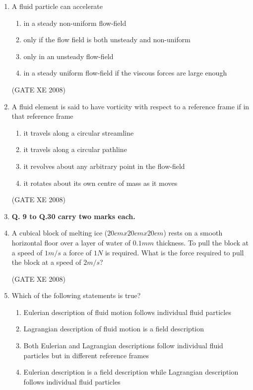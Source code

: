\documentclass[12pt]{article}
\begin{document}
\begin{enumerate}
(GATE XE 2008)
\item A fluid particle can accelerate

\begin{enumerate}
\item  in a steady non-uniform flow-field
\item  only if the flow field is both unsteady and non-uniform 
\item  only in an unsteady flow-field
\item  in a steady uniform flow-field if the viscous forces are large enough
\end{enumerate}

(GATE XE 2008)
\item A fluid element is said to have vorticity with respect to a reference frame if in that reference frame

\begin{enumerate}
\item  it travels along a circular streamline
\item  it travels along a circular pathline
\item  it revolves about any arbitrary point in the flow-field
\item  it rotates about its own centre of mass as it moves
\end{enumerate}

(GATE XE 2008)
\item[] \textbf{Q. 9 to Q.30 carry two marks each.}

\item A cubical block of melting ice ($20 cm x 20 cm x 20 cm$) rests on a smooth horizontal floor over a layer of water of $0.1 mm$ thickness. To pull the block at a speed of $1 m/s$ a force of $1 N$ is required. What is the force required to pull the block at a speed of $2 m/s$?

\begin{enumerate}
\end{enumerate}

(GATE XE 2008)
\item  Which of the following statements is true?

\begin{enumerate}
\item  Eulerian description of fluid motion follows individual fluid particles 
\item  Lagrangian description of fluid motion is a field description 
\item  Both Eulerian and Lagrangian descriptions follow individual fluid particles but in different reference frames
\item  Eulerian description is a field description while Lagrangian description follows individual fluid particles
\end{enumerate}


\end{enumerate}
\end{document}
